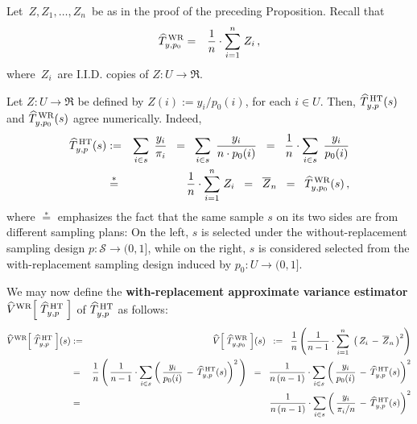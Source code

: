 \vskip 0.5cm
\noindent
Let \,$Z, Z_{1}, \ldots, Z_{n}$\, be as in the proof of the preceding Proposition.
Recall that
\begin{eqnarray*}
\widehat{T}^{\,\textnormal{WR}}_{y,p_{0}}
&=&
	\dfrac{1}{n}\cdot \overset{n}{\underset{i = 1}{\sum}}\; Z_{i}\,,
\end{eqnarray*}
where \,$Z_{i}$\, are I.I.D. copies of $Z : U \longrightarrow \Re$.


Let \;$Z : U \longrightarrow \Re$\; be defined by
\;$Z(i) := y_{i} / p_{0}(i)$,\; for each \;$i \in U$.\;
Then,
\;$\widehat{T}^{\,\textnormal{HT}}_{y,p}(s)$\; and
\;$\widehat{T}^{\,\textnormal{WR}}_{y,p_{0}}(s)$\;
agree numerically.
Indeed,
\begin{eqnarray*}
\widehat{T}^{\,\textnormal{HT}}_{y,p}(s)
& := &
	\underset{i \in s}{\sum}\;\, \dfrac{y_{i}}{\pi_{i}}
\;\; = \;\;
	\underset{i \in s}{\sum}\;\, \dfrac{y_{i}}{n \cdot p_{0}(i)}
\;\; = \;\;
	\dfrac{1}{n}\cdot \underset{i \in s}{\sum}\;\, \dfrac{y_{i}}{p_{0}(i)}
\\
& \overset{*}{=} &
	\dfrac{1}{n}\cdot \overset{n}{\underset{i = 1}{\sum}}\; Z_{i}
\;\; = \;\;
	\overline{Z}_{n}
\;\; = \;\;
	\widehat{T}^{\,\textnormal{WR}}_{y,p_{0}}(s)\,,
\end{eqnarray*}
where \;$\overset{*}{=}$\; emphasizes the fact that the same sample \;$s$\;
on its two sides are from different sampling plans:
On the left, \;$s$\; is selected under the without-replacement sampling design
$p : \mathcal{S} \longrightarrow (0,1]$, while on the right,
\;$s$\; is considered selected from the with-replacement sampling design
induced by \;$p_{0} : U \longrightarrow (0,1]$.

\vskip 0.5cm
\noindent
We may now define the
\textbf{with-replacement approximate variance estimator}
\;$\widehat{V}^{\textnormal{WR}}\!\left[\;\widehat{T}^{\,\textnormal{HT}}_{y,p}\;\right]$\;
of \;$\widehat{T}^{\,\textnormal{HT}}_{y,p}$\; as follows:
\begin{eqnarray*}
\widehat{V}^{\textnormal{WR}}\!\left[\;\widehat{T}^{\,\textnormal{HT}}_{y,p}\;\right]\!(s)
& := &
	\widehat{V}\!\left[\;\widehat{T}^{\,\textnormal{WR}}_{y,p_{0}}\;\right]\!(s)
\;\; := \;\;
	\dfrac{1}{n}\left(
		\dfrac{1}{n-1}\cdot\overset{n}{\underset{i=1}{\sum}}\;
		\left(\,Z_{i}\,-\,\overline{Z}_{n}\,\right)^{2}
		\right)
\\
& = &
	\dfrac{1}{n}\left(\,
		\dfrac{1}{n-1}\cdot\underset{i \in s}{\sum}
		\left(\,\dfrac{y_{i}}{p_{0}(i)}\,-\,\widehat{T}^{\,\textnormal{HT}}_{y,p}(s)\right)^{2}
		\,\right)
\;\; = \;\;
	\dfrac{1}{n\,(n-1)}\cdot\underset{i \in s}{\sum}
		\left(\,
		\dfrac{y_{i}}{p_{0}(i)}\,-\,\widehat{T}^{\,\textnormal{HT}}_{y,p}(s)
		\right)^{2}
\\
& = &
	\dfrac{1}{n\,(n-1)}\cdot\underset{i \in s}{\sum}
		\left(\,
		\dfrac{y_{i}}{\pi_{i}/n}\,-\,\widehat{T}^{\,\textnormal{HT}}_{y,p}(s)
		\right)^{2}
\end{eqnarray*}

